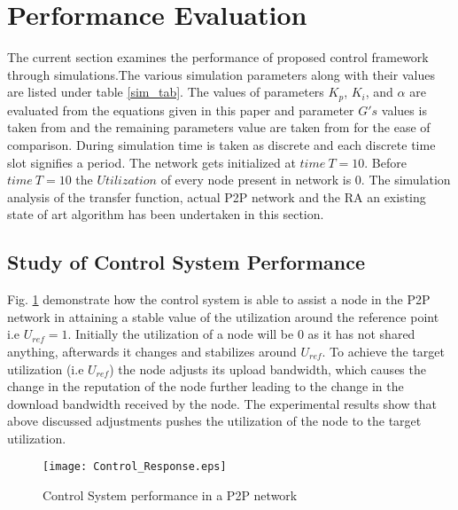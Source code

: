 \documentclass[journal]{IEEEtran}
\begin{document}
\section{Performance Evaluation}
\label{Performance_Evaluation}
The current section examines the performance of proposed control framework through simulations.The various simulation parameters along with their values are listed under table \ref{sim_tab}. The values of parameters $K_p$, $K_i$, and $\alpha$ are evaluated from the equations given in this paper and parameter $G's$ values is taken from \cite{cntrol} and the remaining parameters value are taken from \cite{Satsiou} for the ease of comparison. During simulation time is taken as discrete and each discrete time slot signifies a period. The network gets initialized  at $time ~T=10$. Before $time ~T=10$ the $Utilization$ of every node present in network is $0$. The simulation analysis of the transfer function, actual P2P network and the RA \cite{Satsiou} an existing state of art algorithm has been undertaken in this section.
\subsection{Study of Control System Performance}
Fig. \ref{Control_Performance} demonstrate how the control system is able to assist a node  in the P2P network in attaining a stable value of the utilization  around the reference point i.e $U_{ref}=1$. Initially the utilization of a node will be $0$ as it has not shared anything, afterwards it changes and  stabilizes around $U_{ref}$. To achieve the target utilization (i.e $U_{ref}$) the node adjusts its upload bandwidth, which causes the change in the reputation of the node further leading to the change in the download bandwidth received by the node. The experimental results show that above discussed adjustments pushes the utilization of the node to the target utilization.
\begin{figure}[!t]
	\centering
	\texttt{[image: Control\_Response.eps]}
	\caption{Control System performance in a P2P network}
	\label{Control_Performance}
\end{figure}  
\end{document}
